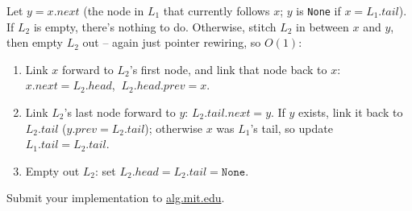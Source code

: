 \documentclass[12pt,twoside]{article}
\begin{document}
\begin{problems}
\begin{problemparts}
\problempart %
Let $y = x.next$ (the node in $L_1$ that currently follows $x$; $y$ is \texttt{None} if
$x = L_1.tail$). If $L_2$ is empty, there's nothing to do. Otherwise, stitch $L_2$ in between
$x$ and $y$, then empty $L_2$ out -- again just pointer rewiring, so $O(1)$:

\begin{enumerate}
\item Link $x$ forward to $L_2$'s first node, and link that node back to $x$:
$x.next = L_2.head$, $\ L_2.head.prev = x$.
\item Link $L_2$'s last node forward to $y$: $L_2.tail.next = y$. If $y$ exists, link it back
to $L_2.tail$ ($y.prev = L_2.tail$); otherwise $x$ was $L_1$'s tail, so update
$L_1.tail = L_2.tail$.
\item Empty out $L_2$: set $L_2.head = L_2.tail = \texttt{None}$.
\end{enumerate}

\problempart Submit your implementation to {\small\url{alg.mit.edu}}.
\end{problemparts}

\end{problems}
\end{document}
